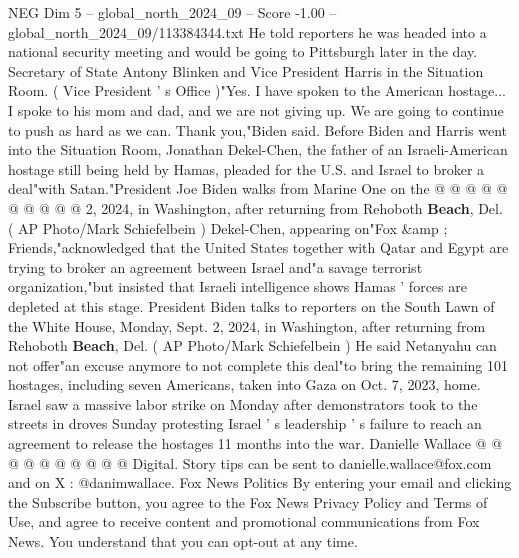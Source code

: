 \begin{textsample}{NEG Dim 5 – global\_north\_2024\_09 – Score -1.00 – global\_north\_2024\_09/113384344.txt}
He told reporters he was headed into a national security meeting and would be going to Pittsburgh later in the day.
Secretary of State Antony Blinken and Vice President Harris in the Situation Room. ( Vice President ' s Office )"Yes.
I have spoken to the American hostage...
I spoke to his mom and dad, and we are not giving up.
We are going to continue to push as hard as we can.
Thank you,"Biden said.
Before Biden and Harris went into the Situation Room, Jonathan Dekel-Chen, the father of an Israeli-American hostage still being held by Hamas, pleaded for the U.S. and Israel to broker a deal"with Satan."President Joe Biden walks from Marine One on the @ @ @ @ @ @ @ @ @ @ 2, 2024, in Washington, after returning from Rehoboth \textbf{Beach}, Del. ( AP Photo/Mark Schiefelbein ) Dekel-Chen, appearing on"Fox \&amp ; Friends,"acknowledged that the United States together with Qatar and Egypt are trying to broker an agreement between Israel and"a savage terrorist organization,"but insisted that Israeli intelligence shows Hamas ' forces are depleted at this stage.
President Biden talks to reporters on the South Lawn of the White House, Monday, Sept. 2, 2024, in Washington, after returning from Rehoboth \textbf{Beach}, Del. ( AP Photo/Mark Schiefelbein ) He said Netanyahu can not offer"an excuse anymore to not complete this deal"to bring the remaining 101 hostages, including seven Americans, taken into Gaza on Oct. 7, 2023, home.
Israel saw a massive labor strike on Monday after demonstrators took to the streets in droves Sunday protesting Israel ' s leadership ' s failure to reach an agreement to release the hostages 11 months into the war.
Danielle Wallace @ @ @ @ @ @ @ @ @ @ Digital.
Story tips can be sent to danielle.wallace@fox.com and on X : @danimwallace.
Fox News Politics By entering your email and clicking the Subscribe button, you agree to the Fox News Privacy Policy and Terms of Use, and agree to receive content and promotional communications from Fox News.
You understand that you can opt-out at any time.

\end{textsample}
